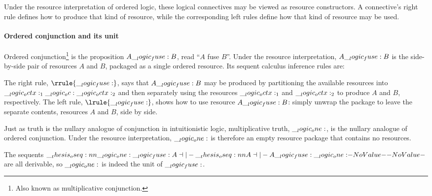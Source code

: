 Under the resource interpretation of ordered logic, these logical connectives may be viewed as resource constructors.
A connective's right rule defines how to produce that kind of resource, while the corresponding left rules define how that kind of resource may be used.

\paragraph*{Ordered conjunction and its unit}
Ordered conjunction\footnote{Also known as multiplicative conjunction.} is the proposition $A \__logic_fuse: B$, read \enquote{$A$ fuse $B$}.
Under the resource interpretation, $A \__logic_fuse: B$ is the side-by-side pair of resources $A$ and $B$, packaged as a single ordered resource.
Its sequent calculus inference rules are:
The right rule, $\rrule{\fuse}$, says that $A \__logic_fuse: B$ may be produced by partitioning the available resources into $\__logic_octx:_1 \__logic_oc: \__logic_octx:_2$ and then separately using the resources $\__logic_octx:_1$ and $\__logic_octx:_2$ to produce $A$ and $B$, respectively.
The left rule, $\lrule{\fuse}$, shows how to use resource $A \__logic_fuse: B$: simply unwrap the package to leave the separate contents, resources $A$ and $B$, side by side.

Just as truth is the nullary analogue of conjunction in intuitionistic logic, multiplicative truth, $\__logic_one:$, is the nullary analogue of ordered conjunction.
Under the resource interpretation, $\__logic_one:$ is therefore an empty resource package that contains no resources.
The sequents $\oseq{\one \fuse A \dashv|- \oseq{A \dashv|- A \fuse \one}}$ are all derivable, so $\__logic_one:$ is indeed the unit of $\__logic_fuse:$.%

